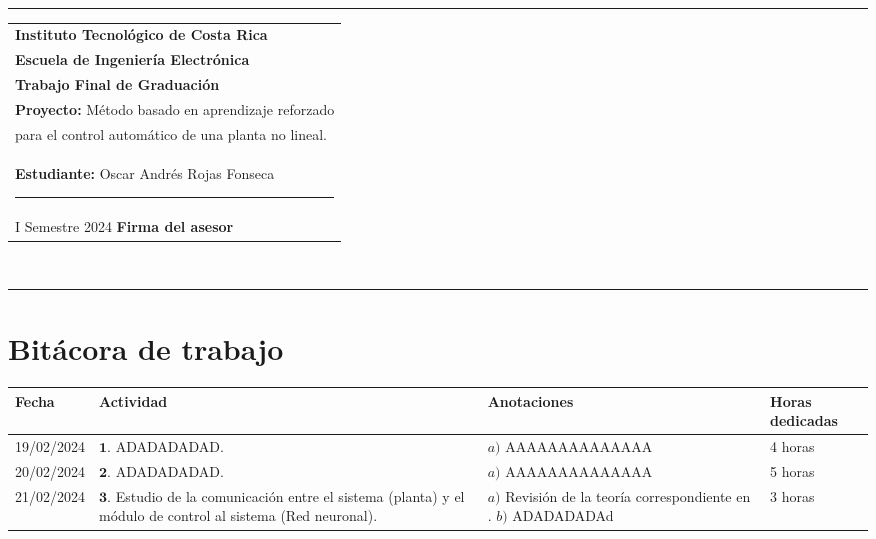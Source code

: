 \documentclass[12pt]{article}
\begin{document}
\hfill\\
\rule{\textwidth}{1.5pt}

\begin{minipage}[t]{85mm}
  \begin{tabular}{l}
    \textbf{\large Instituto Tecnológico de Costa Rica} \\  
    \textbf{Escuela de Ingeniería Electrónica} \\
    \textbf{Trabajo Final de Graduación} \\
    \textbf{Proyecto:} Método basado en aprendizaje reforzado \\para el control automático de una planta no lineal. \\
    \textbf{Estudiante:} Oscar Andrés Rojas Fonseca \hspace{3cm}\rule{4.5cm}{1.5pt}\\
    I Semestre 2024 \hspace{8.5cm}\textbf{Firma del asesor}
  \end{tabular}
\end{minipage}
\hfill\\
\rule{\textwidth}{1.5pt}


\section*{Bitácora de trabajo}

\begin{minipage}[h]{\textwidth}
	\centering
	\begin{tabularx}{\textwidth}{|p{2cm}|X|X|p{2cm}|} 
		\hline
		\rowcolor{encabezado}
		\textbf{Fecha} & 
		\textbf{Actividad} & 
		\textbf{Anotaciones} & 
		\textbf{Horas dedicadas} \\ \hline
		19/02/2024 & 
		$\mathbf{1}.$ ADADADADAD. & 
		$a)$ AAAAAAAAAAAAAA \newline  & 
		4 horas \\
	 	20/02/2024 & 
	 	$\mathbf{2}.$ ADADADADAD. &
	 	$a)$ AAAAAAAAAAAAAA \newline  & 
	 	5 horas \\
	 	21/02/2024 & 
	 	$\mathbf{3}.$ Estudio de la comunicación entre el sistema (planta) y el módulo de control al sistema (Red neuronal). & 
	 	$a)$ Revisión de la teoría correspondiente en \cite{DataScience}. \newline 
	 	$b)$ ADADADADAd \newline & 
	 	3 horas \\
	 	
	 	\hline
	\end{tabularx}
\end{minipage}	 	
	 	
\end{document}
